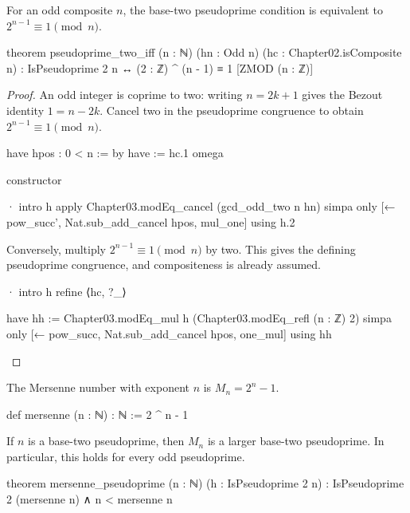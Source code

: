 \begin{theorem}
  \label{ent:thm:pseudoprime-two-iff}
  For an odd composite $n$, the base-two pseudoprime condition is equivalent to
  $2^{n-1}\equiv1\pmod n$.

  \begin{lean}
    theorem pseudoprime_two_iff (n : ℕ) (hn : Odd n) (hc : Chapter02.isComposite n) :
        IsPseudoprime 2 n ↔ (2 : ℤ) ^ (n - 1) ≡ 1 [ZMOD (n : ℤ)]
  \end{lean}
\end{theorem}

\begin{proof}
  An odd integer is coprime to two: writing $n=2k+1$ gives the Bezout identity $1=n-2k$.
  Cancel two in the pseudoprime congruence to obtain $2^{n-1}\equiv1\pmod n$.

  \begin{lean}
    have hpos : 0 < n := by
      have := hc.1
      omega

    constructor

    · intro h
      apply Chapter03.modEq_cancel (gcd_odd_two n hn)
      simpa only [← pow_succ', Nat.sub_add_cancel hpos, mul_one] using h.2
  \end{lean}

  Conversely, multiply $2^{n-1}\equiv1\pmod n$ by two.
  This gives the defining pseudoprime congruence, and compositeness is already assumed.

  \begin{lean}
    · intro h
      refine ⟨hc, ?_⟩

      have hh := Chapter03.modEq_mul h (Chapter03.modEq_refl (n : ℤ) 2)
      simpa only [← pow_succ, Nat.sub_add_cancel hpos, one_mul] using hh
  \end{lean}
\end{proof}

\begin{definition}
  The Mersenne number with exponent $n$ is $M_n=2^n-1$.

  \begin{lean}
    def mersenne (n : ℕ) : ℕ := 2 ^ n - 1
  \end{lean}
\end{definition}

\begin{theorem}
  \label{ent:thm:mersenne-pseudoprime}
  If $n$ is a base-two pseudoprime, then $M_n$ is a larger base-two pseudoprime.
  In particular, this holds for every odd pseudoprime.

  \begin{lean}
    theorem mersenne_pseudoprime (n : ℕ) (h : IsPseudoprime 2 n) :
        IsPseudoprime 2 (mersenne n) ∧ n < mersenne n
  \end{lean}
\end{theorem}

